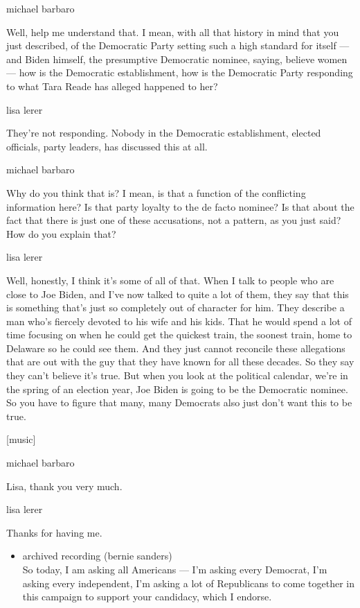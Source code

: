 michael barbaro

Well, help me understand that. I mean, with all that history in mind
that you just described, of the Democratic Party setting such a high
standard for itself --- and Biden himself, the presumptive Democratic
nominee, saying, believe women --- how is the Democratic establishment,
how is the Democratic Party responding to what Tara Reade has alleged
happened to her?

lisa lerer

They're not responding. Nobody in the Democratic establishment, elected
officials, party leaders, has discussed this at all.

michael barbaro

Why do you think that is? I mean, is that a function of the conflicting
information here? Is that party loyalty to the de facto nominee? Is that
about the fact that there is just one of these accusations, not a
pattern, as you just said? How do you explain that?

lisa lerer

Well, honestly, I think it's some of all of that. When I talk to people
who are close to Joe Biden, and I've now talked to quite a lot of them,
they say that this is something that's just so completely out of
character for him. They describe a man who's fiercely devoted to his
wife and his kids. That he would spend a lot of time focusing on when he
could get the quickest train, the soonest train, home to Delaware so he
could see them. And they just cannot reconcile these allegations that
are out with the guy that they have known for all these decades. So they
say they can't believe it's true. But when you look at the political
calendar, we're in the spring of an election year, Joe Biden is going to
be the Democratic nominee. So you have to figure that many, many
Democrats also just don't want this to be true.

{[}music{]}

michael barbaro

Lisa, thank you very much.

lisa lerer

Thanks for having me.

\begin{itemize}
\tightlist
\item
  archived recording (bernie sanders)\\
  So today, I am asking all Americans --- I'm asking every Democrat, I'm
  asking every independent, I'm asking a lot of Republicans to come
  together in this campaign to support your candidacy, which I endorse.
\end{itemize}

